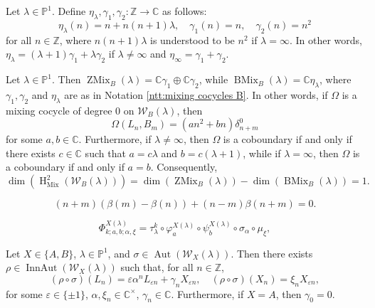 \documentclass[10pt,a4paper]{amsart}
\DeclareMathOperator{\Aut}{Aut}
\DeclareMathOperator{\BMix}{BMix}
\DeclareMathOperator{\HH}{H}
\DeclareMathOperator{\InnAut}{InnAut}
\DeclareMathOperator{\Mix}{Mix}
\DeclareMathOperator{\ZMix}{ZMix}
\newcommand{\CC}{\mathbb{C}}
\newcommand{\PP}{\mathbb{P}}
\newcommand{\W}{\mathcal{W}}
\newcommand{\ZZ}{\mathbb{Z}}
\begin{document}
\begin{Notation}\label{ntt:mixing cocycles B}
    Let $\lambda \in \PP^1$. Define $\eta_\lambda, \gamma_1, \gamma_2 \colon \ZZ \to \CC$ as follows:
    $$\eta_\lambda(n) = n + n(n + 1)\lambda, \quad \gamma_1(n) = n, \quad \gamma_2(n) = n^2$$
    for all $n \in \ZZ$, where $n(n + 1)\lambda$ is understood to be $n^2$ if $\lambda = \infty$. In other words, $\eta_\lambda = (\lambda + 1) \gamma_1 + \lambda \gamma_2$ if $\lambda \neq \infty$ and $\eta_\infty = \gamma_1 + \gamma_2$.
\end{Notation}

\begin{proposition}\label{prop:W_B mixing cocycles}
    Let $\lambda \in \PP^1$. Then $\ZMix_B(\lambda) = \CC \gamma_1 \oplus \CC \gamma_2$, while $\BMix_B(\lambda) = \CC \eta_\lambda$, where $\gamma_1,\gamma_2$ and $\eta_\lambda$ are as in Notation \ref{ntt:mixing cocycles B}. In other words, if $\Omega$ is a mixing cocycle of degree 0 on $\W_B(\lambda)$, then
    $$\Omega(L_n,B_m) = (an^2 + bn)\delta_{n+m}^0$$
    for some $a,b \in \CC$. Furthermore, if $\lambda \neq \infty$, then $\Omega$ is a coboundary if and only if there exists $c \in \CC$ such that $a = c\lambda$ and $b = c(\lambda + 1)$, while if $\lambda = \infty$, then $\Omega$ is a coboundary if and only if $a = b$.
    Consequently,
    $$\dim(\HH_{\Mix}^2(\W_B(\lambda))) = \dim(\ZMix_B(\lambda)) - \dim(\BMix_B(\lambda)) = 1.$$
\end{proposition}

\begin{equation}\label{eq:simple mixing cocycle B}
    (n + m)(\beta(m) - \beta(n)) + (n - m)\beta(n + m) = 0.
\end{equation}

    \begin{equation}\label{eq:outer automorphism general form}
        \Phi_{k;a,b;\alpha,\xi}^{X(\lambda)} = \tau_\lambda^k \circ \varphi_a^{X(\lambda)} \circ \psi_b^{X(\lambda)} \circ \sigma_\alpha \circ \mu_\xi,
    \end{equation}

\begin{proposition}\label{prop:automorphism nice form}
    Let $X \in \{A,B\}$, $\lambda \in \PP^1$, and $\sigma \in \Aut(\W_X(\lambda))$. Then there exists $\rho \in \InnAut(\W_X(\lambda))$ such that, for all $n \in \ZZ$,
    $$(\rho \circ \sigma)(L_n) = \varepsilon \alpha^n L_{\varepsilon n} + \gamma_n X_{\varepsilon n}, \quad (\rho \circ \sigma)(X_n) = \xi_n X_{\varepsilon n},$$
    for some $\varepsilon \in \{\pm 1\}$, $\alpha, \xi_n \in \CC^\times$, $\gamma_n \in \CC$. Furthermore, if $X = A$, then $\gamma_0 = 0$.
\end{proposition}
\end{document}
